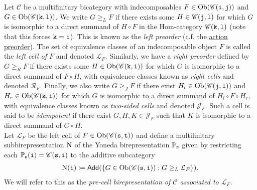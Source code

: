 \noindent Let $\mathscr{C}$ be a multifinitary bicategory with indecomposables $F \in \textup{Ob}(\mathscr{C}(\textup{\texttt{i}}, \textup{\texttt{j}}))$ and $G \in \textup{Ob}(\mathscr{C}(\textup{\texttt{k}}, \textup{\texttt{l}}))$. We write $G \geq_L F$ if there exists some $H \in \mathscr{C}(\textup{\texttt{j}}, \textup{\texttt{l}})$ for which $G$ is isomorphic to a direct summand of $H \circ F$ in the Hom-category $\mathscr{C}(\textup{\texttt{k}}, \textup{\texttt{l}})$ (note that this forces $\textup{\texttt{k}} = \textup{\texttt{i}}$). This is known as the {\em left preorder} (c.f. the \hyperref[ActionPreorder]{action preorder}). The set of equivalence classes of an indecomposable object $F$ is called the {\em left cell of $F$} and denoted $\mathcal{L}_F$. Similarly, we have a {\em right preorder} defined by $G \geq_R F$ if there exists some $H \in \textup{Ob}(\mathscr{C}(\textup{\texttt{k}}, \textup{\texttt{i}}))$ for which $G$ is isomorphic to a direct summand of $F \circ H$, with equivalence classes known as {\em right cells} and denoted $\mathcal{R}_F$. Finally, we also write $G \geq_{J} F$ if there exist $H_l \in \textup{Ob}(\mathscr{C}(\textup{\texttt{j}}, \textup{\texttt{l}}))$ and $H_r \in \textup{Ob}(\mathscr{C}(\textup{\texttt{k}}, \textup{\texttt{i}}))$ for which $G$ is isomorphic to a direct summand of $H_l \circ F \circ H_r$, with equivalence classes known as {\em two-sided cells} and denoted $\mathcal{J}_F$. Such a cell is said to be {\em idempotent} if there exist $G, H, K \in \mathcal{J}_F$ such that $K$ is isomorphic to a direct summand of $G \circ H$.\\


\noindent Let $\mathcal{L}_F$ be the left cell of $F \in \textup{Ob}(\mathscr{C}(\textup{\texttt{s}}, \textup{\texttt{t}}))$ and define a multifinitary subbirepresentation $\textup{N}$ of the Yoneda birepresentation $\mathbb{P}_{\textup{\texttt{s}}}$ given by restricting each $\mathbb{P}_{\textup{\texttt{s}}}(\textup{\texttt{i}}) = \mathscr{C}(\textup{\texttt{s}}, \textup{\texttt{i}})$ to the additive subcategory
\begin{align*}
\begin{split}
\textup{N}(\textup{\texttt{i}}) \coloneqq \textup{\textsf{Add}}(\{G \in \textup{Ob}(\mathscr{C}(\textup{\texttt{s}}, \textup{\texttt{i}})) : G \geq_L \mathcal{L}_F\}).
\end{split}
\end{align*}
\noindent We will refer to this as the \textit{pre-cell birepresentation of $\mathscr{C}$ associated to $\mathcal{L}_F$}.\\

